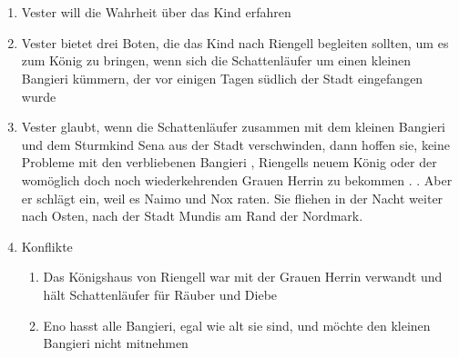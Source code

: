 \documentclass[12pt,a4paper,onecolumn,twoside,ngerman]{book}
\newcommand{\Sena}{Sena}
\newcommand{\Sturmkind}{Sturmkind}
\newcommand{\Bangiri}{Bangieri}
\newcommand{\Schattenlaufer}{Schattenläufer}
\newcommand{\Eno}{Eno}
\newcommand{\Nox}{Nox}
\newcommand{\Lobarn}{Lobarn}
\newcommand{\Vester}{Vester}
\newcommand{\Naimo}{Naimo}
\newcommand{\Nordmark}{Nordmark}
\newcommand{\Rhingell}{Riengell}
\newcommand{\Mundis}{Mundis}
\begin{document}
\section[Das Geschäft mit \Lobarn]{}
\begin{enumerate}
  \item {\Vester} will die Wahrheit über das Kind erfahren
  \item {\Vester} bietet drei Boten, die das Kind nach {\Rhingell} begleiten sollten, um es zum König zu bringen, wenn sich die {\Schattenlaufer} um einen kleinen {\Bangiri} kümmern, der vor einigen Tagen südlich der Stadt eingefangen wurde
  \item {\Vester} glaubt, wenn die {\Schattenlaufer} zusammen mit dem kleinen {\Bangiri} und dem {\Sturmkind} {\Sena} aus der Stadt verschwinden, dann hoffen sie, keine Probleme mit den verbliebenen {\Bangiri} , {\Rhingell}s neuem König oder der womöglich doch noch wiederkehrenden Grauen Herrin zu bekommen
.\linebreak
. Aber er schlägt ein, weil es {\Naimo} und {\Nox} raten. Sie fliehen in der Nacht weiter nach Osten, nach der Stadt {\Mundis} am Rand der {\Nordmark}.
  \item Konflikte
  \begin{enumerate}
    \item Das Königshaus von {\Rhingell} war mit der Grauen Herrin verwandt und hält {\Schattenlaufer} für Räuber und Diebe
    \item {\Eno} hasst alle {\Bangiri}, egal wie alt sie sind, und möchte den kleinen {\Bangiri} nicht mitnehmen
  \end{enumerate}  
\end{enumerate}

\end{document}
